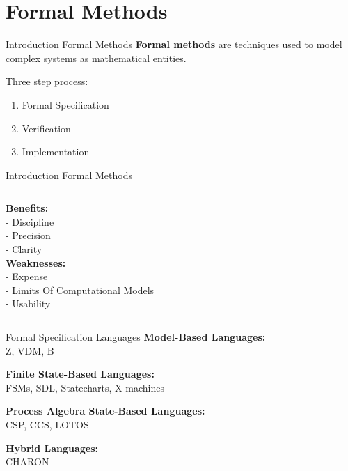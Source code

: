 \documentclass{beamer}
\begin{document}
  \section{Formal Methods}
  
  \begin{frame}{Introduction Formal Methods}
    \textbf{Formal methods} are techniques used to model complex systems as
    mathematical entities.



    Three step process:\\
    \begin{enumerate}
      \item Formal Specification
      \item Verification
      \item Implementation
    \end{enumerate}

  \end{frame}

  \begin{frame}{Introduction Formal Methods}
    \begin{columns}
        \textbf{Benefits:}\\
        - Discipline\\
        - Precision\\
        - Clarity\\
        \textbf{Weaknesses:}\\
        - Expense\\
        - Limits Of Computational Models\\
        - Usability\\
    \end{columns}

    \end{frame}

    \begin{frame}{Formal Specification Languages}
      \textbf{Model-Based Languages:}\\
    Z, VDM, B

    \textbf{Finite State-Based Languages:}\\
    FSMs, SDL, Statecharts, X-machines

    \textbf{Process Algebra State-Based Languages:}\\
    CSP, CCS, LOTOS

    \textbf{Hybrid Languages:}\\
    CHARON
  \end{frame}
\end{document}
